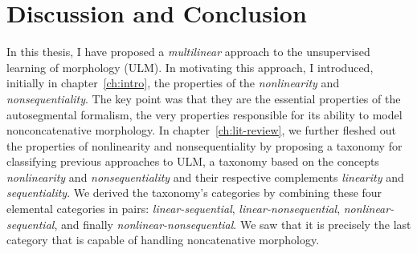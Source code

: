 \chapter{Discussion and Conclusion}
\label{ch:conclusion}

In this thesis, I have proposed a \emph{multilinear} approach to the unsupervised learning of morphology (ULM).
In motivating this approach, I introduced, initially in chapter~\ref{ch:intro}, the properties of the \emph{nonlinearity} 
and \emph{nonsequentiality}. The key point was that they are the 
essential properties of the autosegmental formalism, the very properties responsible for its
ability to model nonconcatenative morphology. 
In chapter~\ref{ch:lit-review}, we further fleshed out the properties of nonlinearity and nonsequentiality
by proposing a taxonomy for classifying previous approaches to ULM, 
a taxonomy based on the concepts \emph{nonlinearity} 
and \emph{nonsequentiality} and their respective complements \emph{linearity}  and \emph{sequentiality}. We  derived the taxonomy's categories by combining these four elemental categories in pairs:
\emph{linear-sequential}, \emph{linear-nonsequential}, \emph{nonlinear-sequential}, 
and finally \emph{nonlinear-nonsequential}. 
We saw that it is precisely the last category that is capable of handling
noncatenative morphology. 

